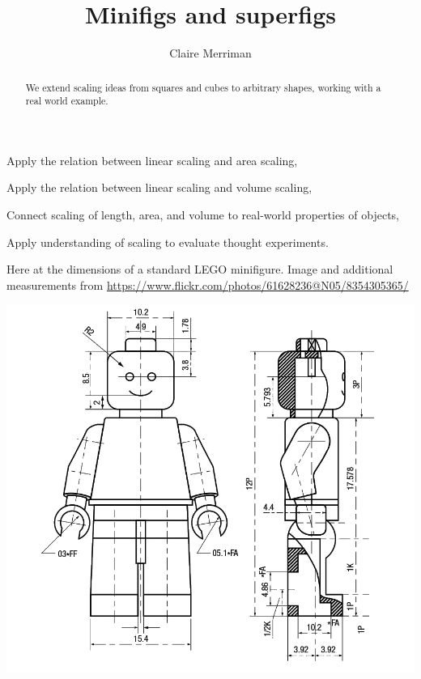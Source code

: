\documentclass[handout,nooutcomes,noauthor,hints]{ximera}
\title{Minifigs and superfigs}
\author{Claire Merriman}
\begin{document}
\begin{abstract}
  We extend scaling ideas from squares and cubes to arbitrary shapes,
  working with a real world example.
\end{abstract}
\maketitle

\begin{listOutcomes}
\item Apply the relation between linear scaling and area scaling,
\item Apply the relation between linear scaling and volume scaling,
\item Connect scaling of length, area, and volume to real-world properties of objects,
\item Apply understanding of scaling to evaluate thought experiments.
\end{listOutcomes}


Here at the dimensions of a standard LEGO minifigure. Image and
additional measurements from
\url{https://www.flickr.com/photos/61628236@N05/8354305365/}
\begin{center}
 \includegraphics[height=.55\textheight]{lego-minifigure.png}
\end{center}
\end{document}
